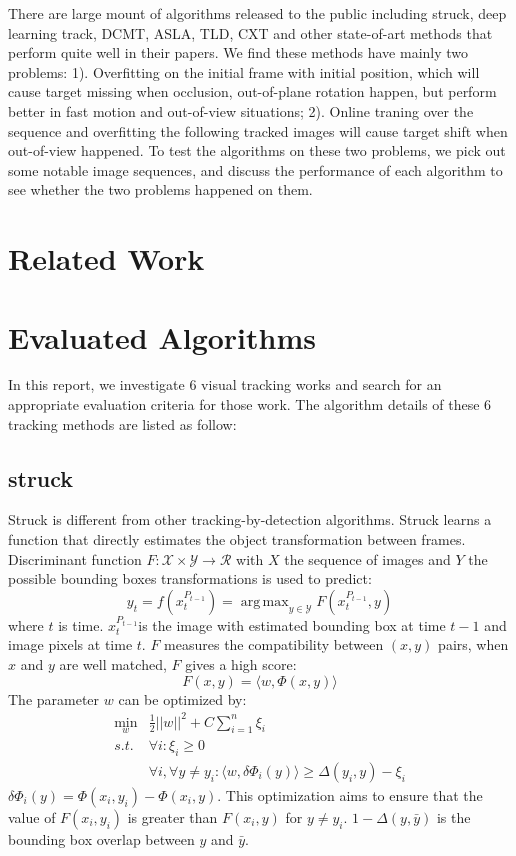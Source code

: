 \documentclass{acm_proc_article-sp}
\DeclareMathOperator*{\argmax}{arg\,max}
\DeclareMathOperator*{\minbelow}{min}
\begin{document}
There are large mount of algorithms released to the public including struck\cite{struck}, deep learning track\cite{dlt}, DCMT\cite{dcmt}, ASLA\cite{asla}, TLD\cite{tld}, CXT\cite{cxt} and other state-of-art methods that perform quite well in their papers. 
We find these methods have mainly two problems: 
1). Overfitting on the initial frame with initial position, which will cause target missing when occlusion, out-of-plane rotation happen, but perform better in fast motion and out-of-view situations;
2). Online traning over the sequence and overfitting the following tracked images will cause target shift when out-of-view happened.
To test the algorithms on these two problems, we pick out some notable image sequences, and discuss the performance of each algorithm to see whether the two problems happened on them.

\section{Related Work}


\section{Evaluated Algorithms}
In this report, we investigate 6 visual tracking works and search for an appropriate evaluation criteria for those work. The algorithm details of these 6 tracking methods are listed as follow:

\subsection{struck}
Struck\cite{struck} is different from other tracking-by-detection algorithms. Struck learns a function that directly estimates the object transformation between frames. Discriminant function $F:\mathcal{X} \times \mathcal{Y} \to \mathcal{R}$ with $X$ the sequence of images and $Y$ the possible bounding boxes transformations is used to predict:
\[
y_t = f(x_t^{P_{t-1}}) = \argmax_{y\in \mathcal{Y}}F(x_t^{P_{t-1}},y)
\]
where $t$ is time. $x_t^{P_{t-1}}$is the image with estimated bounding box at time $t-1$ and image pixels at time $t$. $F$ measures the compatibility between $(x,y)$ pairs, when $x$ and $y$ are well matched, $F$ gives a high score:
\[
F(x,y)=\langle w, \Phi(x,y) \rangle
\]
The parameter $w$ can be optimized by:
\begin{align}
\minbelow_w	&\frac{1}{2}||w||^2 + C \sum_{i=1}^n\xi_i\nonumber\\
	s.t.	&\forall i: \xi_i \ge 0\nonumber\\
			&\forall i, \forall y\not= y_i : \langle w, \delta\Phi_i(y)\rangle \ge \Delta(y_i,y)-\xi_i
\end{align}
$\delta\Phi_i(y)=\Phi(x_i, y_i) - \Phi(x_i, y)$. This optimization aims to ensure that the value of $F(x_i, y_i)$ is greater than $F(x_i, y)$ for $y\not= y_i$. $1-\Delta(y,\bar{y})$ is the bounding box overlap between $y$ and $\bar{y}$.
\end{document}

